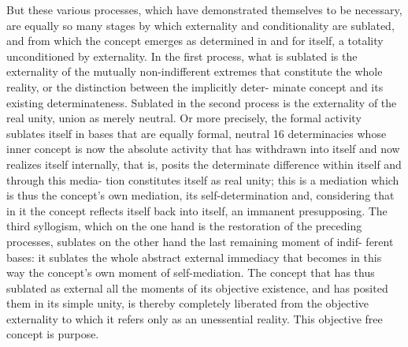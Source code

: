 But these various processes, which have demonstrated themselves to be
necessary, are equally so many stages by which externality and conditionality
are sublated, and from which the concept emerges as determined in and
for itself, a totality unconditioned by externality. In the first process, what
is sublated is the externality of the mutually non-indifferent extremes that
constitute the whole reality, or the distinction between the implicitly deter-
minate concept and its existing determinateness. Sublated in the second
process is the externality of the real unity, union as merely neutral. Or
more precisely, the formal activity sublates itself in bases that are equally
formal, neutral 16 determinacies whose inner concept is now the absolute
activity that has withdrawn into itself and now realizes itself internally, that
is, posits the determinate difference within itself and through this media-
tion constitutes itself as real unity; this is a mediation which is thus the
concept's own mediation, its self-determination and, considering that in it
the concept reflects itself back into itself, an immanent presupposing. The
third syllogism, which on the one hand is the restoration of the preceding
processes, sublates on the other hand the last remaining moment of indif-
ferent bases: it sublates the whole abstract external immediacy that becomes
in this way the concept's own moment of self-mediation. The concept that
has thus sublated as external all the moments of its objective existence, and
has posited them in its simple unity, is thereby completely liberated from
the objective externality to which it refers only as an unessential reality.
This objective free concept is purpose.
